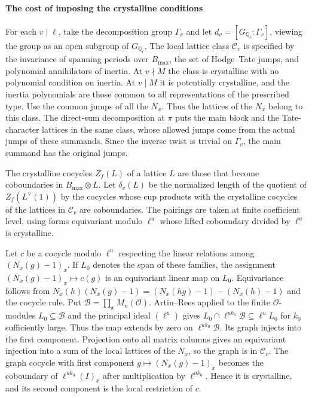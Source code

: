 \paragraph{The cost of imposing the crystalline conditions}
For each \(v\mid\ell\), take the decomposition group \(\Gamma_v\)
and let \(d_v=[G_{\mathbb Q_\ell}:\Gamma_v]\), viewing the group as
an open subgroup of \(G_{\mathbb Q_\ell}\).
The local lattice class \(\mathcal C_v\) is specified by the invariance
of spanning periods over \(B_{\max}\), the set of Hodge--Tate jumps,
and polynomial annihilators of inertia. At \(v\nmid M\) the class is
crystalline with no polynomial condition on inertia. At \(v\mid M\)
it is potentially crystalline, and the inertia polynomials are those
common to all representations of the prescribed type.
Use the common jumps of all the \(N_x\).
Thus the lattices of the \(N_x\) belong to this class.
The direct-sum decomposition at \(\pi\) puts the main block and the
Tate-character lattices in the same class, whose allowed jumps come
from the actual jumps of these summands. Since the inverse twist is
trivial on \(\Gamma_v\), the main summand has the original jumps.

The crystalline cocycles \(Z_f(L)\) of a lattice \(L\) are those that
become coboundaries in \(B_{\max}\otimes L\).
Let \(\delta_v(L)\) be the normalized length of the quotient of
\(Z_f(L^\vee(1))\) by the cocycles whose cup products with the
crystalline cocycles of the lattices in \(\mathcal C_v\) are
coboundaries. The pairings are taken at finite coefficient level,
using forms equivariant modulo \(\ell^u\) whose lifted coboundary
divided by \(\ell^u\) is crystalline.

Let \(c\) be a cocycle modulo \(\ell^u\) respecting the linear
relations among \((N_x(g)-1)_x\). If \(L_0\) denotes the span of
these families, the assignment \((N_x(g)-1)_x\mapsto c(g)\) is
an equivariant linear map on \(L_0\). Equivariance follows from
\(N_x(h)(N_x(g)-1)=(N_x(hg)-1)-(N_x(h)-1)\) and the cocycle rule.
Put \(\mathcal B=\prod_xM_n(\mathcal O)\).
Artin--Rees applied to the finite \(\mathcal O\)-modules
\(L_0\subseteq\mathcal B\) and the principal ideal \((\ell^u)\)
gives \(L_0\cap \ell^{u k_0}\mathcal B\subseteq\ell^uL_0\) for
\(k_0\) sufficiently large.
Thus the map extends by zero on \(\ell^{u k_0}\mathcal B\).
Its graph injects into the first component. Projection onto all
matrix columns gives an equivariant injection into a sum of the
local lattices of the \(N_x\), so the graph is in \(\mathcal C_v\).
The graph cocycle with first component \(g\mapsto(N_x(g)-1)_x\)
becomes the coboundary of \(\ell^{u k_0}(I)_x\) after
multiplication by \(\ell^{u k_0}\). Hence it is crystalline, and
its second component is the local restriction of \(c\).

